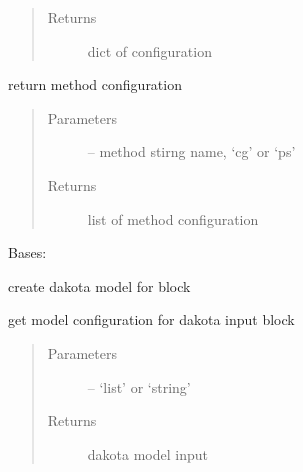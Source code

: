 \documentclass[letterpaper,10pt,english]{sphinxmanual}
\begin{document}
\begin{fulllineitems}
\begin{fulllineitems}
\begin{quote}
\begin{description}
\item[{Returns}] \leavevmode
dict of configuration

\end{description}\end{quote}

\end{fulllineitems}


\begin{fulllineitems}
\label{\detokenize{src/apidocs/genopt:genopt.DakotaMethod.method}}
return method configuration
\begin{quote}\begin{description}
\item[{Parameters}] \leavevmode
{} -- method stirng name, `cg' or `ps'

\item[{Returns}] \leavevmode
list of method configuration

\end{description}\end{quote}

\end{fulllineitems}


\end{fulllineitems}


\begin{fulllineitems}
\label{\detokenize{src/apidocs/genopt:genopt.DakotaModel}}
Bases: \href{https://docs.python.org/2/library/functions.html\#object}{}

create dakota model for  block

\begin{fulllineitems}
\label{\detokenize{src/apidocs/genopt:genopt.DakotaModel.get_config}}
get model configuration for dakota input block
\begin{quote}\begin{description}
\item[{Parameters}] \leavevmode
{} -- `list' or `string'

\item[{Returns}] \leavevmode
dakota model input

\end{description}\end{quote}

\end{fulllineitems}


\end{fulllineitems}
\end{document}
